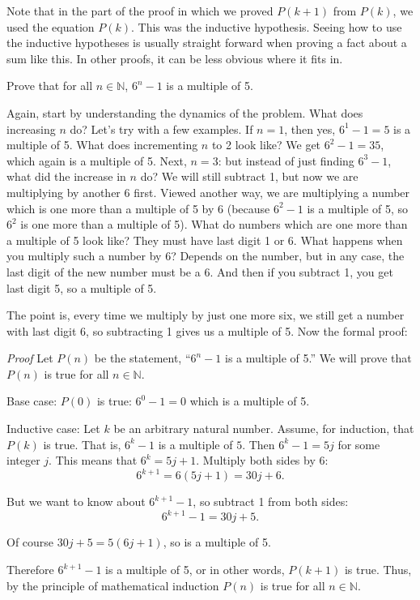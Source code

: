 \documentclass[11pt,]{book}
\makeatletter
\theoremstyle{ptxplainnotitle}
\theoremstyle{ptxplaintitle}
\renewcommand*{\proofname}{Proof}
\renewenvironment{proof}[1][\proofname]{\par
  \pushQED{\qed}%
  \normalfont \topsep6\p@\@plus6\p@\relax
  \trivlist
  \item\relax
    {\itshape
    #1\@addpunct{.}}\hspace\labelsep\ignorespaces
}{%
  \popQED\endtrivlist\@endpefalse
}
\theoremstyle{ptxdefinitionnotitle}
\theoremstyle{ptxdefinitiontitle}
\theoremstyle{ptxdefinitionnotitle}
\theoremstyle{ptxdefinitiontitle}
\theoremstyle{ptxdefinitionnotitle}
\theoremstyle{ptxdefinitiontitle}
\theoremstyle{ptxdefinitiontitlenonumber}
\theoremstyle{ptxdefinitiontitlenonumber}
\numberwithin{equation}{chapter}
\newcommand{\N}{\mathbb N}
\makeatother
\begin{document}
\hypertarget{p-562}{}%
Note that in the part of the proof in which we proved \(P(k+1)\) from \(P(k)\), we used the equation \(P(k)\). This was the inductive hypothesis. Seeing how to use the inductive hypotheses is usually straight forward when proving a fact about a sum like this. In other proofs, it can be less obvious where it fits in.%
\begin{example}\label{example-26}
\hypertarget{p-563}{}%
Prove that for all \(n \in \N\), \(6^n - 1\) is a multiple of 5.%
\par\smallskip%
\noindent\textbf{}\hypertarget{solution-84}{}\hypertarget{p-564}{}%
Again, start by understanding the dynamics of the problem. What does increasing \(n\) do? Let's try with a few examples. If \(n = 1\), then yes, \(6^1 - 1 = 5\) is a multiple of 5. What does incrementing \(n\) to 2 look like? We get \(6^2 - 1 = 35\), which again is a multiple of 5. Next, \(n = 3\): but instead of just finding \(6^3 - 1\), what did the increase in \(n\) do? We will still subtract 1, but now we are multiplying by another 6 first. Viewed another way, we are multiplying a number which is one more than a multiple of 5 by 6 (because \(6^2 - 1\) is a multiple of 5, so \(6^2\) is one more than a multiple of 5). What do numbers which are one more than a multiple of 5 look like? They must have last digit 1 or 6. What happens when you multiply such a number by 6? Depends on the number, but in any case, the last digit of the new number must be a 6. And then if you subtract 1, you get last digit 5, so a multiple of 5.%
\par
\hypertarget{p-565}{}%
The point is, every time we multiply by just one more six, we still get a number with last digit 6, so subtracting 1 gives us a multiple of 5. Now the formal proof:%
\begin{proof}\hypertarget{proof-3}{}
\hypertarget{p-566}{}%
Let \(P(n)\) be the statement, ``\(6^n - 1\) is a multiple of 5.'' We will prove that \(P(n)\) is true for all \(n \in \N\).%
\par
\hypertarget{p-567}{}%
Base case: \(P(0)\) is true: \(6^0 -1 = 0\) which is a multiple of 5.%
\par
\hypertarget{p-568}{}%
Inductive case: Let \(k\) be an arbitrary natural number. Assume, for induction, that \(P(k)\) is true. That is, \(6^k - 1\) is a multiple of \(5\). Then \(6^k - 1 = 5j\) for some integer \(j\). This means that \(6^k = 5j + 1\). Multiply both sides by \(6\):%
\begin{equation*}
6^{k+1} = 6(5j+1) = 30j + 6.
\end{equation*}
%
\par
\hypertarget{p-569}{}%
But we want to know about \(6^{k+1} - 1\), so subtract 1 from both sides:%
\begin{equation*}
6^{k+1} - 1 = 30j + 5.
\end{equation*}
%
\par
\hypertarget{p-570}{}%
Of course \(30j+5 = 5(6j+1)\), so is a multiple of 5.%
\par
\hypertarget{p-571}{}%
Therefore \(6^{k+1} - 1\) is a multiple of 5, or in other words, \(P(k+1)\) is true. Thus, by the principle of mathematical induction \(P(n)\) is true for all \(n \in \N\).%
\end{proof}
\end{example}
\end{document}
